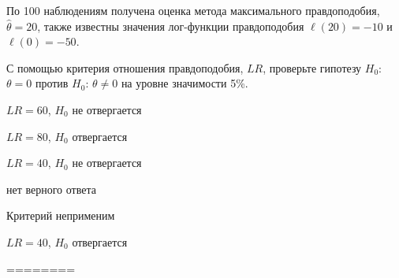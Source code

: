 
\begin{question}
По 100 наблюдениям получена оценка метода максимального правдоподобия,
\(\hat\theta = 20\), также известны значения лог-функции правдоподобия
\(\ell(20) = -10\) и \(\ell(0)= - 50\).

С помощью критерия отношения правдоподобия, \(LR\), проверьте гипотезу
\(H_0\): \(\theta = 0\) против \(H_0\): \(\theta \neq 0\) на уровне
значимости 5\%.
\begin{answerlist}
  \item \(LR = 60\), \(H_0\) не отвергается
  \item \(LR = 80\), \(H_0\) отвергается
  \item \(LR = 40\), \(H_0\) не отвергается
  \item нет верного ответа
  \item Критерий неприменим
  \item \(LR = 40\), \(H_0\) отвергается
\end{answerlist}
\end{question}

\begin{solution}
========
\end{solution}

